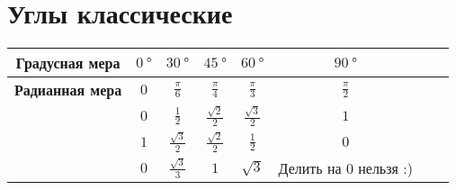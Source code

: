 \section*{Углы классические}


\begin{table}[!ht]
\setlength{\tabcolsep}{1em} %
\centering
  \tabulinesep=1.5mm
  \begin{tabu}{|c|c|c|c|c|c|c|c|}
    \hline
    \textbf{Градусная мера}
      & $\SI{0}{\degree}$
      & $\SI{30}{\degree}$
      & $\SI{45}{\degree}$
      & $\SI{60}{\degree}$
      & $\SI{90}{\degree}$\\
    \hline
    \textbf{Радианная мера}
      & $\displaystyle 0$
      & $\displaystyle \frac{\pi}{6}$
      & $\displaystyle \frac{\pi}{4}$
      & $\displaystyle \frac{\pi}{3}$
      & $\displaystyle \frac{\pi}{2}$\\
    \hline
    \textbf{\bm{$\sin \theta$}}
      & $\displaystyle 0$
      & $\displaystyle \frac{1}{2}$
      & $\displaystyle \frac{\sqrt 2}{2}$
      & $\displaystyle \frac{\sqrt 3}{2}$
      & $\displaystyle 1$\\
    \hline
    \textbf{\bm{$\cos \theta$}}
      & $\displaystyle 1$
      & $\displaystyle \frac{\sqrt 3}{2}$
      & $\displaystyle \frac{\sqrt 2}{2}$
      & $\displaystyle \frac{1}{2}$
      & $\displaystyle 0$\\
    \hline
    \textbf{\bm{$\tg \theta$}}
      & $\displaystyle 0$
      & $\displaystyle \frac{\sqrt 3}{3}$
      & $\displaystyle 1$
      & $\displaystyle \sqrt 3$
      & Делить на 0 нельзя :) \\
    \hline
  \end{tabu}
\end{table}